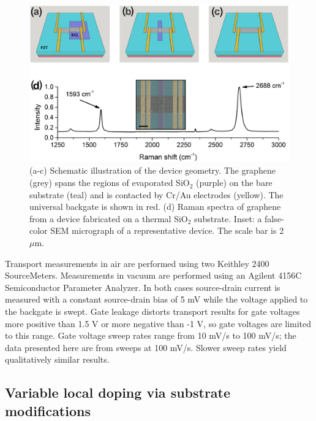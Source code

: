 \documentclass[edeposit,fullpage,draftthesis]{uiucthesis2009}
\begin{document}
\begin{figure}
  \centering
  \includegraphics[width=.8\textwidth]{images/resultsanddiscussion/pztpaper/figure1}
  \caption[Schematic illustration of graphene-ferroelectric pn junction device geometry]{
   (a-c) Schematic illustration of the device geometry. The graphene (grey) spans the regions of evaporated SiO$_2$ (purple) on the bare substrate (teal) and is contacted by Cr/Au electrodes (yellow). The universal backgate is shown in red.
   (d) Raman spectra of graphene from a device fabricated on a thermal SiO$_2$ substrate. %
   Inset: a false-color SEM micrograph of a representative device. The scale bar is 2 $\mu$m.
  }
  \label{fig:devices}
\end{figure}

Transport measurements in air are performed using two Keithley 2400 SourceMeters. Measurements in vacuum are performed using an Agilent 4156C Semiconductor Parameter Analyzer. In both cases source-drain current is measured with a constant source-drain bias of 5 mV while the voltage applied to the backgate is swept. Gate leakage distorts transport results for gate voltages more positive than 1.5 V or more negative than -1 V, so gate voltages are limited to this range. Gate voltage sweep rates range from 10 mV/s to 100 mV/s; the data presented here are from sweeps at 100 mV/s. Slower sweep rates yield qualitatively similar results.


    \subsection{Variable local doping via substrate modifications}
    
\end{document}
